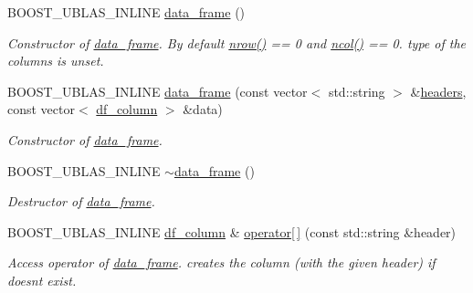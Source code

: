 \begin{DoxyCompactItemize}
\item 
B\+O\+O\+S\+T\+\_\+\+U\+B\+L\+A\+S\+\_\+\+I\+N\+L\+I\+NE \hyperlink{classboost_1_1numeric_1_1ublas_1_1data__frame_a1fe0c252f16d65762717c1da13432e8f}{data\+\_\+frame} ()
\begin{DoxyCompactList}\small\item\em Constructor of \hyperlink{classboost_1_1numeric_1_1ublas_1_1data__frame}{data\+\_\+frame}. By default {\ttfamily \hyperlink{classboost_1_1numeric_1_1ublas_1_1data__frame_a7f773294cbd41d890b5469e2a85abd32}{nrow()}} == 0 and \hyperlink{classboost_1_1numeric_1_1ublas_1_1data__frame_adf7817e6cf0dcc7fa6d892a351b5c9a8}{ncol()} == 0. type of the columns is unset. \end{DoxyCompactList}\item 
B\+O\+O\+S\+T\+\_\+\+U\+B\+L\+A\+S\+\_\+\+I\+N\+L\+I\+NE \hyperlink{classboost_1_1numeric_1_1ublas_1_1data__frame_a1cfb2a3083283f2aceff85649120ce61}{data\+\_\+frame} (const vector$<$ std\+::string $>$ \&\hyperlink{classboost_1_1numeric_1_1ublas_1_1data__frame_aff5e603e988e7b710a3df6104d706c12}{headers}, const vector$<$ \hyperlink{classboost_1_1numeric_1_1ublas_1_1df__column}{df\+\_\+column} $>$ \&data)
\begin{DoxyCompactList}\small\item\em Constructor of \hyperlink{classboost_1_1numeric_1_1ublas_1_1data__frame}{data\+\_\+frame}. \end{DoxyCompactList}\item 
B\+O\+O\+S\+T\+\_\+\+U\+B\+L\+A\+S\+\_\+\+I\+N\+L\+I\+NE \hyperlink{classboost_1_1numeric_1_1ublas_1_1data__frame_a5ab7148ee2440c33f10b59c466eba998}{$\sim$data\+\_\+frame} ()
\begin{DoxyCompactList}\small\item\em Destructor of \hyperlink{classboost_1_1numeric_1_1ublas_1_1data__frame}{data\+\_\+frame}. \end{DoxyCompactList}\item 
B\+O\+O\+S\+T\+\_\+\+U\+B\+L\+A\+S\+\_\+\+I\+N\+L\+I\+NE \hyperlink{classboost_1_1numeric_1_1ublas_1_1df__column}{df\+\_\+column} \& \hyperlink{classboost_1_1numeric_1_1ublas_1_1data__frame_a7bc6a73935b5d7f0dbdfffdcdae841dd}{operator\mbox{[}$\,$\mbox{]}} (const std\+::string \&header)
\begin{DoxyCompactList}\small\item\em Access operator of \hyperlink{classboost_1_1numeric_1_1ublas_1_1data__frame}{data\+\_\+frame}. creates the column (with the given header) if doesn\textquotesingle{}t exist. \end{DoxyCompactList}\item 

\end{DoxyCompactItemize}
